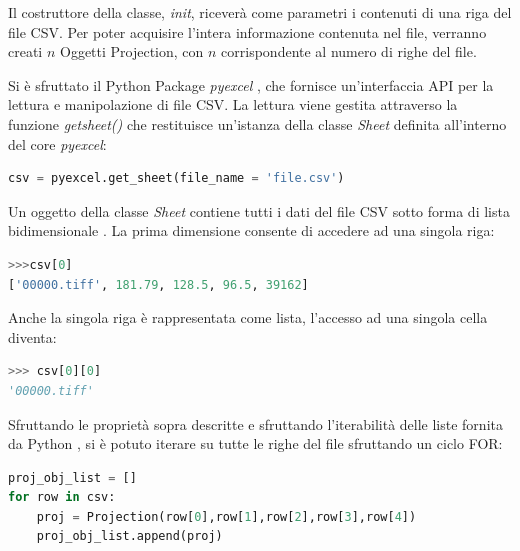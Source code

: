 \documentclass[a4paper,12pt, doubleside]{report}
\begin{document}
               Il costruttore della classe, \textit{\textunderscore \textunderscore init\textunderscore \textunderscore}, riceverà come parametri i contenuti di una riga del file CSV. Per poter acquisire l'intera informazione contenuta nel file, verranno creati $n$ Oggetti Projection, con $n$ corrispondente al numero di righe del file.
            
            \bigskip
            \par
                Si è sfruttato il Python Package \textit{pyexcel} \cite{pyexcel}, che fornisce un'interfaccia API per la lettura e manipolazione di file CSV. La lettura viene gestita attraverso la funzione \textit{get\textunderscore sheet()} che restituisce un'istanza della classe \textit{Sheet} definita all'interno del core \textit{pyexcel}:
                
                \begin{lstlisting}[language=python, frame=bt]
csv = pyexcel.get_sheet(file_name = 'file.csv')
                \end{lstlisting}
            
            \bigskip
            \par
                Un oggetto della classe \textit{Sheet} contiene tutti i dati del file CSV sotto forma di lista bidimensionale \cite{pyexcel-docs}. La prima dimensione consente di accedere ad una singola riga:
                
                \begin{lstlisting}[language=python, frame=bt]
>>>csv[0]
['00000.tiff', 181.79, 128.5, 96.5, 39162]
                \end{lstlisting}
            
                Anche la singola riga è rappresentata come lista, l'accesso ad una singola cella diventa:
                \begin{lstlisting}[language=python, frame=bt]
>>> csv[0][0]
'00000.tiff'
                \end{lstlisting}
            
            \bigskip
            \par
                Sfruttando le proprietà sopra descritte e sfruttando l'iterabilità delle liste fornita da Python \cite{python-list}, si è potuto iterare su tutte le righe del file sfruttando un ciclo FOR:
            
                \begin{lstlisting}[language=python, frame=bt]
proj_obj_list = []
for row in csv:
    proj = Projection(row[0],row[1],row[2],row[3],row[4])
    proj_obj_list.append(proj)
                \end{lstlisting}
            
\end{document}
